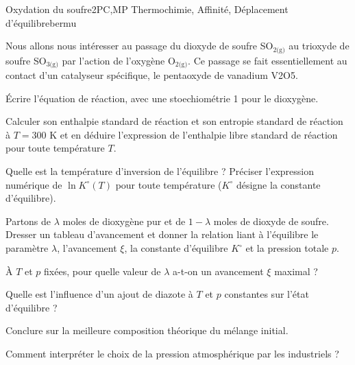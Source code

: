 \begin{exercise}{Oxydation du soufre}{2}{PC,MP}
{Thermochimie, Affinité, Déplacement d'équilibre}{bermu}

    Nous allons nous intéresser au passage du dioxyde de soufre SO$_{2 \text{(g)}}$ au trioxyde de soufre SO$_{3 \text{(g)}}$ par l'action de l'oxygène O$_{2 \text{(g)}}$. Ce passage se fait essentiellement au contact d’un catalyseur spécifique, le pentaoxyde de vanadium V2O5.

\begin{questions}
    \question \'Ecrire l'équation de réaction, avec une stoechiométrie 1 pour le dioxygène.
    
    \question Calculer son enthalpie standard de réaction et son entropie standard de réaction à $T = 300$ K et en déduire l'expression de l’enthalpie libre standard de réaction pour toute température $T$.
    
    \question Quelle est la température d’inversion de l’équilibre ? Préciser l’expression numérique de $\ln K^\circ(T)$ pour toute température ($K^\circ$ désigne la constante d’équilibre).
    

    \question Partons de $\lambda$ moles de dioxygène pur et de $1 - \lambda$ moles de dioxyde de soufre. Dresser un tableau d’avancement et donner la relation liant à l’équilibre le paramètre $\lambda$, l’avancement $\xi$, la constante d’équilibre $K^\circ$ et la pression totale $p$.
    
    \question À $T$ et $p$ fixées, pour quelle valeur de $\lambda$ a-t-on un avancement $\xi$ maximal ?
    
    
    \question Quelle est l’influence d’un ajout de diazote à $T$ et $p$ constantes sur l’état d’équilibre ?

    \question Conclure sur la meilleure composition théorique du mélange initial.
    
    \question Comment interpréter le choix de la pression atmosphérique par les industriels ?
    

\end{questions}
\end{exercise}
